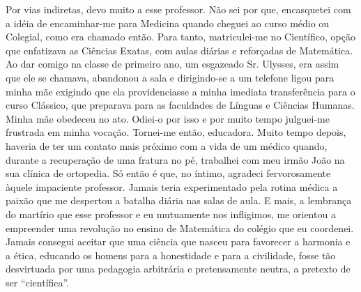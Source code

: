 Por vias indiretas, devo muito a esse professor. 
Não sei por que, encasquetei com a idéia de encaminhar-me para Medicina quando cheguei ao curso médio ou Colegial, como era chamado então. 
Para tanto, matriculei-me no Científico, opção que enfatizava as Ciências Exatas, com aulas diárias e reforçadas de Matemática. 
Ao dar comigo na classe de primeiro ano, um esgazeado Sr. Ulysses, era assim que ele se chamava, abandonou a sala e dirigindo-se a um telefone ligou para minha mãe exigindo que ela providenciasse a minha imediata transferência para o curso Clássico, que preparava para as faculdades de Línguas e Ciências Humanas. 
Minha mãe obedeceu no ato. Odiei-o por isso e por muito tempo julguei-me frustrada em minha vocação. 
Tornei-me então, educadora. 
Muito tempo depois, haveria de ter um contato mais próximo com a vida de um médico quando, durante a recuperação de uma fratura no pé, trabalhei com meu irmão João na sua clínica de ortopedia. 
Só então é que, no íntimo, agradeci fervorosamente àquele impaciente professor. Jamais teria experimentado pela rotina médica a paixão que me despertou a batalha diária nas salas de aula. 
E mais, a lembrança do martírio que esse professor e eu mutuamente nos infligimos, me orientou a empreender uma revolução no ensino de Matemática do colégio que eu coordenei. 
Jamais consegui aceitar que uma ciência que nasceu para favorecer a harmonia e a ética, educando os homens para a honestidade e para a civilidade, fosse tão desvirtuada por uma pedagogia arbitrária e pretensamente neutra, a pretexto de ser “científica”. 


